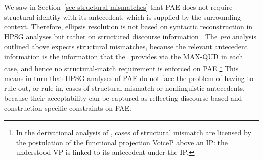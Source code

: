 {We saw in Section~\ref{sec-structural-mismatches} that PAE does not require structural identity with its antecedent, which is supplied by the surrounding context. Therefore, ellipsis resolution is not based on syntactic reconstruction in HPSG analyses but rather on structured discourse information \citep{Ginzburg:Sag:2000}. %
%
The {\it pro} analysis outlined above expects
structural mismatches, %
%
because the relevant antecedent information is the information that the \DGB\ provides via the MAX-QUD in each case, and hence no structural-match requirement is enforced on PAE.\footnote{In the derivational
analysis of \citet{Merchant2013}, cases of structural mismatch are licensed by
the postulation of the functional projection VoiceP above an IP: the understood
VP is linked to its antecedent under the IP.} This means in turn that HPSG analyses of PAE do not face the problem of having to rule out, or rule in, cases of structural mismatch or nonlinguistic antecedents, because their acceptability can be captured as reflecting discourse-based and construction-specific constraints on PAE.



}
